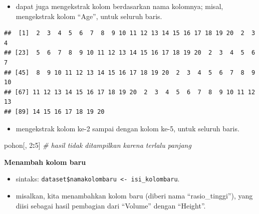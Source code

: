 \documentclass[
  12pt,
  a4paper,
]{scrbook}
\newenvironment{Shaded}{\begin{snugshade}}{\end{snugshade}}
\newcommand{\CommentTok}[1]{\textcolor[rgb]{0.56,0.35,0.01}{\textit{#1}}}
\newcommand{\DataTypeTok}[1]{\textcolor[rgb]{0.13,0.29,0.53}{#1}}
\newcommand{\DecValTok}[1]{\textcolor[rgb]{0.00,0.00,0.81}{#1}}
\newcommand{\KeywordTok}[1]{\textcolor[rgb]{0.13,0.29,0.53}{\textbf{#1}}}
\newcommand{\NormalTok}[1]{#1}
\newcommand{\OperatorTok}[1]{\textcolor[rgb]{0.81,0.36,0.00}{\textbf{#1}}}
\newcommand{\StringTok}[1]{\textcolor[rgb]{0.31,0.60,0.02}{#1}}
\providecommand{\tightlist}{%
  \setlength{\itemsep}{0pt}\setlength{\parskip}{0pt}}
\begin{document}
\begin{itemize}
\tightlist
\item
  dapat juga mengekstrak kolom berdasarkan nama kolomnya; misal,
  mengekstrak kolom ``Age'', untuk seluruh baris.
\end{itemize}

\begin{Shaded}
\end{Shaded}

\begin{verbatim}
##  [1]  2  3  4  5  6  7  8  9 10 11 12 13 14 15 16 17 18 19 20  2  3  4
## [23]  5  6  7  8  9 10 11 12 13 14 15 16 17 18 19 20  2  3  4  5  6  7
## [45]  8  9 10 11 12 13 14 15 16 17 18 19 20  2  3  4  5  6  7  8  9 10
## [67] 11 12 13 14 15 16 17 18 19 20  2  3  4  5  6  7  8  9 10 11 12 13
## [89] 14 15 16 17 18 19 20
\end{verbatim}

\begin{itemize}
\tightlist
\item
  mengekstrak kolom ke-2 sampai dengan kolom ke-5, untuk seluruh baris.
\end{itemize}

\begin{Shaded}
\begin{Highlighting}[]
\NormalTok{pohon[, }\DecValTok{2}\OperatorTok{:}\DecValTok{5}\NormalTok{]  }\CommentTok{# hasil tidak ditampilkan karena terlalu panjang}
\end{Highlighting}
\end{Shaded}

\textbf{Menambah kolom baru}

\begin{itemize}
\tightlist
\item
  sintaks:
  \texttt{dataset\$namakolombaru\ \textless{}-\ isi\_kolombaru}.
\item
  misalkan, kita menambahkan kolom baru (diberi nama ``rasio\_tinggi''),
  yang diisi sebagai hasil pembagian dari ``Volume'' dengan ``Height''.
\end{itemize}

\begin{Shaded}
\end{Shaded}
\end{document}
